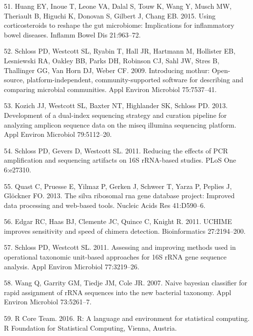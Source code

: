 \documentclass[12pt,]{article}
\begin{document}
\hypertarget{ref-huang_cort_2015}{}
51. Huang EY, Inoue T, Leone VA, Dalal S, Touw K, Wang Y, Musch MW,
Theriault B, Higuchi K, Donovan S, Gilbert J, Chang EB. 2015. Using
corticosteroids to reshape the gut microbiome: Implications for
inflammatory bowel diseases. Inflamm Bowel Dis 21:963--72.

\hypertarget{ref-schloss_mothur_2009}{}
52. Schloss PD, Westcott SL, Ryabin T, Hall JR, Hartmann M, Hollister
EB, Lesniewski RA, Oakley BB, Parks DH, Robinson CJ, Sahl JW, Stres B,
Thallinger GG, Van Horn DJ, Weber CF. 2009. Introducing mothur:
Open-source, platform-independent, community-supported software for
describing and comparing microbial communities. Appl Environ Microbiol
75:7537--41.

\hypertarget{ref-Kozich_MiSeqSOP_2013}{}
53. Kozich JJ, Westcott SL, Baxter NT, Highlander SK, Schloss PD. 2013.
Development of a dual-index sequencing strategy and curation pipeline
for analyzing amplicon sequence data on the miseq illumina sequencing
platform. Appl Environ Microbiol 79:5112--20.

\hypertarget{ref-schloss_PCRartifacts_2011}{}
54. Schloss PD, Gevers D, Westcott SL. 2011. Reducing the effects of PCR
amplification and sequencing artifacts on 16S rRNA-based studies. PLoS
One 6:e27310.

\hypertarget{ref-Quast_silva_2013}{}
55. Quast C, Pruesse E, Yilmaz P, Gerken J, Schweer T, Yarza P, Peplies
J, Glöckner FO. 2013. The silva ribosomal rna gene database project:
Improved data processing and web-based tools. Nucleic Acids Res
41:D590--6.

\hypertarget{ref-edgar_uchime_2011}{}
56. Edgar RC, Haas BJ, Clemente JC, Quince C, Knight R. 2011. UCHIME
improves sensitivity and speed of chimera detection. Bioinformatics
27:2194--200.

\hypertarget{ref-schloss_OTUanalysis_2011}{}
57. Schloss PD, Westcott SL. 2011. Assessing and improving methods used
in operational taxonomic unit-based approaches for 16S rRNA gene
sequence analysis. Appl Environ Microbiol 77:3219--26.

\hypertarget{ref-wang_taxonomy_2007}{}
58. Wang Q, Garrity GM, Tiedje JM, Cole JR. 2007. Naive bayesian
classifier for rapid assignment of rRNA sequences into the new bacterial
taxonomy. Appl Environ Microbiol 73:5261--7.

\hypertarget{ref-R}{}
59. R Core Team. 2016. R: A language and environment for statistical
computing. R Foundation for Statistical Computing, Vienna, Austria.
\end{document}
